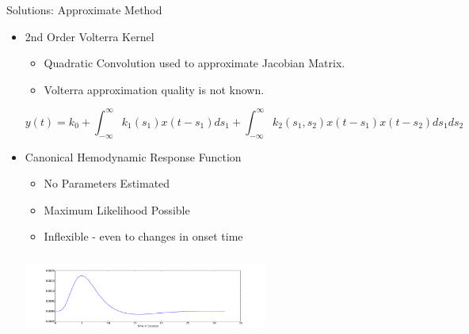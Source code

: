 \documentclass{beamer}
\begin{document}
\begin{frame}{Solutions: Approximate Method}
  \begin{itemize}
    \item 2nd Order Volterra Kernel 
    \begin{itemize}
        \item Quadratic Convolution used to approximate Jacobian Matrix.
        \item Volterra approximation quality is not known.
    \end{itemize}
    {\footnotesize
    $$y(t) = k_0 + \int_{-\infty}^{\infty} k_1(s_1) x(t-s_1) ds_1
        + \int_{-\infty}^{\infty} k_2(s_1,s_2) x(t-s_1)x(t-s_2) ds_1 ds_2$$
    }
    \item Canonical Hemodynamic Response Function
    \begin{itemize}
        \item No Parameters Estimated
        \item Maximum Likelihood Possible
        \item Inflexible - even to changes in onset time
    \end{itemize}
    \begin{center}
    \includegraphics[clip=true,trim=4.88cm 0cm 5cm 1.5cm,height=2.7cm,width=8cm]{HRF}
    \end{center}
    
  \end{itemize}
\end{frame}
%
\end{document}
